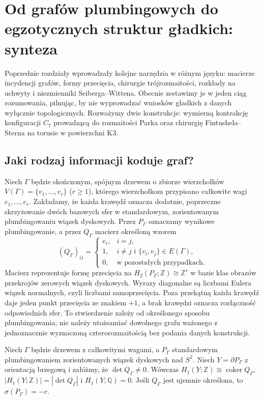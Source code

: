 \chapter{Od grafów plumbingowych do egzotycznych struktur gładkich: synteza}
\label{ch:tg-synteza16}

Poprzednie rozdziały wprowadzały kolejne narzędzia w różnym języku:
macierze incydencji grafów, formy przecięcia, chirurgie trójrozmaitości,
rozkłady na uchwyty i niezmienniki Seiberga--Wittena. Obecnie zestawimy
je w jeden ciąg rozumowania, pilnując, by nie wyprowadzać wniosków
gładkich z danych wyłącznie topologicznych. Rozważymy dwie konstrukcje:
wymierną kontrakcję konfiguracji $C_7$ prowadzącą do rozmaitości Parka
oraz chirurgię Fintushela--Sterna na torusie w powierzchni K3.

\section{Jaki rodzaj informacji koduje graf?}
\label{sec:tg-syn-graph}

Niech $\Gamma$ będzie skończonym, spójnym drzewem o zbiorze
wierzchołków $V(\Gamma)=\{v_1,\ldots,v_r\}$ ($r\ge1$), którego wierzchołkom
przypisano całkowite wagi $e_1,\ldots,e_r$. Zakładamy, że każda
krawędź oznacza dodatnie, poprzeczne skrzyżowanie dwóch bazowych sfer
w standardowym, zorientowanym plumbingowaniu wiązek dyskowych.
Przez $P_\Gamma$ oznaczamy wynikowe plumbingowanie, a przez
$Q_\Gamma$ macierz określoną wzorem
\[
 (Q_\Gamma)_{ij}=\begin{cases}
 e_i,&i=j,\\
 1,&i\ne j\text{ i }\{v_i,v_j\}\in E(\Gamma),\\
 0,&\text{w pozostałych przypadkach}.
 \end{cases}
\]
Macierz reprezentuje formę przecięcia na
$H_2(P_\Gamma;\mathbb Z)\cong\mathbb Z^r$ w bazie klas
obrazów przekrojów zerowych wiązek dyskowych.
Wyrazy diagonalne są liczbami Eulera wiązek
normalnych, czyli liczbami samoprzecięcia.
Poza przekątną każda krawędź daje jeden punkt
przecięcia ze znakiem $+1$, a brak krawędzi
oznacza rozłączność odpowiednich sfer.
To stwierdzenie zależy od określonego sposobu plumbingowania;
nie należy utożsamiać dowolnego grafu ważonego z jednoznacznie
wyznaczoną czterorozmaitością bez podania danych konstrukcji.

\begin{twierdzenie}
\label{thm:tg-syn-boundary}
Niech $\Gamma$ będzie drzewem z całkowitymi wagami, a
$P_\Gamma$ standardowym plumbingowaniem zorientowanych wiązek
dyskowych nad $S^2$. Niech $Y=\partial P_\Gamma$ z orientacją
brzegową i załóżmy, że $\det Q_\Gamma\ne0$. Wówczas
$H_1(Y;\mathbb Z)\cong\operatorname{coker}Q_\Gamma$,
$|H_1(Y;\mathbb Z)|=|\det Q_\Gamma|$ i
$H_1(Y;\mathbb Q)=0$. Jeśli $Q_\Gamma$ jest ujemnie określona,
to $\sigma(P_\Gamma)=-r$.
\end{twierdzenie}

